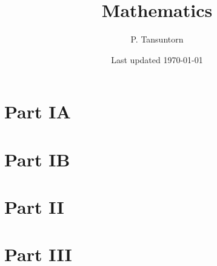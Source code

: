 \documentclass[12pt]{book}
\title{\textbf{Mathematics}}
\author{P. Tansuntorn}
\date{Last updated \today}
\theoremstyle{definition}
\theoremstyle{remark}
\begin{document}
	\frontmatter
	\pagestyle{plain}
	\maketitle
	\tableofcontents
	
	\pagestyle{fancy}
		\fancyhf{}%
		\fancyhead[RO,LE]{\thepage}
		\fancyhead[CO]{\textit{\rightmark}}
		\fancyhead[CE]{\textit{\leftmark}}
		\renewcommand{\headrulewidth}{0pt}
		\renewcommand{\headrulewidth}{0pt}
	
	\mainmatter
	\part{Part IA}
		
		
		
		
		
		
		
		
		
		
	\part{Part IB}
		
		
		
		
		
		
		
		
		
	
	\part{Part II}
		
		
		
		
		
		
		
		
		
		
		
		
		
		
		
		
	
	\part{Part III}
		
		
		
		
	\backmatter
		\printindex
		
\end{document}

